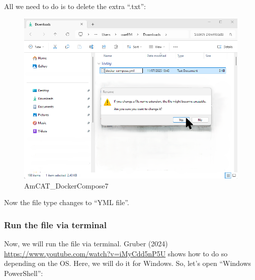 \documentclass[
  letterpaper,
  DIV=11,
  numbers=noendperiod]{scrreprt}
\begin{document}
All we need to do is to delete the extra ``.txt'':

\begin{figure}[H]

{\centering \includegraphics[width=6.25in,height=\textheight]{media/amcat-2.1.2_9.png}

}

\caption{AmCAT\_DockerCompose7}

\end{figure}%

Now the file type changes to ``YML file''.

\subsubsection{Run the file via
terminal}\label{run-the-file-via-terminal}

Now, we will run the file via terminal. Gruber (2024)
\url{https://www.youtube.com/watch?v=iMyCdd5nP5U} shows how to do so
depending on the OS. Here, we will do it for Windows. So, let's open
``Windows PowerShell'':
\end{document}
